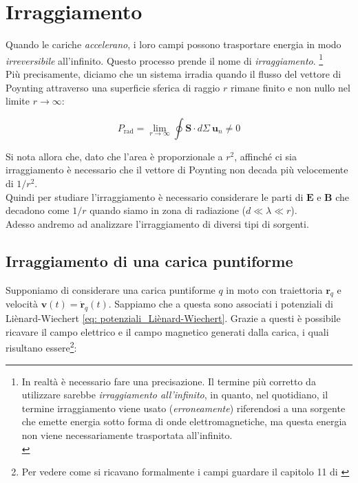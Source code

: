 \chapter{Irraggiamento}

Quando le cariche \emph{accelerano}, i loro campi possono trasportare energia in modo \emph{irreversibile} all'infinito. Questo processo prende il nome di \emph{irraggiamento}. \footnote{In realtà è necessario fare una precisazione. Il termine più corretto da utilizzare sarebbe \emph{irraggiamento all'infinito}, in quanto, nel quotidiano, il termine irraggiamento viene usato (\emph{erroneamente}) riferendosi a una sorgente che emette energia sotto forma di onde elettromagnetiche, ma questa energia non viene necessariamente trasportata all'infinito. \\}  \\

Più precisamente, diciamo che un sistema irradia quando il flusso del vettore di Poynting attraverso una superficie sferica di raggio $r$ rimane finito e non nullo nel limite $r \to \infty$:

\begin{equation}
    P_{\text{rad}} = \lim_{r \to \infty} \oint \mathbf{S} \cdot d \Sigma \ \mathbf{u}_n \neq 0
\end{equation}

Si nota allora che, dato che l'area è proporzionale a $r^2$, affinché ci sia irraggiamento è necessario che il vettore di Poynting non decada più velocemente di $1/r^2$. \\
Quindi per studiare l'irraggiamento è necessario considerare le parti di $\mathbf{E}$ e $\mathbf{B}$ che decadono come $1/r$ quando siamo in zona di radiazione ($d \ll \lambda \ll r$). \\

Adesso andremo ad analizzare l'irraggiamento di diversi tipi di sorgenti. 

\section{Irraggiamento di una carica puntiforme}

Supponiamo di considerare una carica puntiforme $q$ in moto con traiettoria $\mathbf{r}_q$ e velocità $\mathbf{v}(t) = \dot{\mathbf{r}}_q(t)$. Sappiamo che a questa sono associati i potenziali di Liènard-Wiechert \eqref{eq: potenziali_Liènard-Wiechert}. 
Grazie a questi è possibile ricavare il campo elettrico e il campo magnetico generati dalla carica, i quali risultano essere\footnote{Per vedere come si ricavano formalmente i campi guardare il capitolo 11 di \cite{IntroductiontoElectrodynamics}}:

